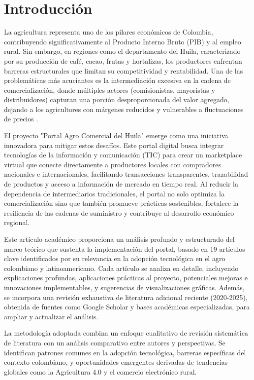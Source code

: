 \section{Introducción}

La agricultura representa uno de los pilares económicos de Colombia, contribuyendo significativamente al Producto Interno Bruto (PIB) y al empleo rural. Sin embargo, en regiones como el departamento del Huila, caracterizado por su producción de café, cacao, frutas y hortalizas, los productores enfrentan barreras estructurales que limitan su competitividad y rentabilidad. Una de las problemáticas más acuciantes es la intermediación excesiva en la cadena de comercialización, donde múltiples actores (comisionistas, mayoristas y distribuidores) capturan una porción desproporcionada del valor agregado, dejando a los agricultores con márgenes reducidos y vulnerables a fluctuaciones de precios \cite{fao2020intermediation}.

El proyecto "Portal Agro Comercial del Huila" emerge como una iniciativa innovadora para mitigar estos desafíos. Este portal digital busca integrar tecnologías de la información y comunicación (TIC) para crear un marketplace virtual que conecte directamente a productores locales con compradores nacionales e internacionales, facilitando transacciones transparentes, trazabilidad de productos y acceso a información de mercado en tiempo real. Al reducir la dependencia de intermediarios tradicionales, el portal no solo optimiza la comercialización sino que también promueve prácticas sostenibles, fortalece la resiliencia de las cadenas de suministro y contribuye al desarrollo económico regional.

Este artículo académico proporciona un análisis profundo y estructurado del marco teórico que sustenta la implementación del portal, basado en 19 artículos clave identificados por su relevancia en la adopción tecnológica en el agro colombiano y latinoamericano. Cada artículo se analiza en detalle, incluyendo explicaciones profundas, aplicaciones prácticas al proyecto, potenciales mejoras e innovaciones implementables, y sugerencias de visualizaciones gráficas. Además, se incorpora una revisión exhaustiva de literatura adicional reciente (2020-2025), obtenida de fuentes como Google Scholar y bases académicas especializadas, para ampliar y actualizar el análisis.

La metodología adoptada combina un enfoque cualitativo de revisión sistemática de literatura con un análisis comparativo entre autores y perspectivas. Se identifican patrones comunes en la adopción tecnológica, barreras específicas del contexto colombiano, y oportunidades emergentes derivadas de tendencias globales como la Agricultura 4.0 y el comercio electrónico rural.

